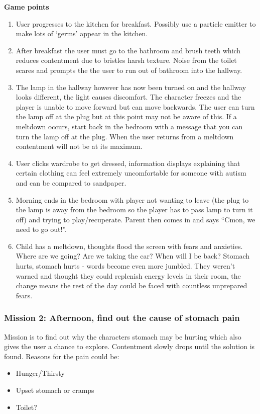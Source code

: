 \documentclass[11pt]{report}
\begin{document}
\textbf{Game points}
\begin{enumerate}
\item User progresses to the kitchen for breakfast. Possibly use a particle emitter to make lots of ‘germs’ appear in the kitchen.
\item After breakfast the user must go to the bathroom and brush teeth which reduces contentment due to bristles harsh texture. Noise from the toilet scares and prompts the the user to run out of bathroom into the hallway.
\item The lamp in the hallway however has now been turned on and the hallway looks different, the light causes discomfort. The character freezes and the player is unable to move forward but can move backwards. The user can turn the lamp off at the plug but at this point may not be aware of this. If a meltdown occurs, start back in the bedroom with a message that you can turn the lamp off at the plug. When the user returns from a meltdown contentment will not be at its maximum.
\item User clicks wardrobe to get dressed, information displays explaining that certain clothing can feel extremely uncomfortable for someone with autism and can be compared to sandpaper.
\item Morning ends in the bedroom with player not wanting to leave (the plug to the lamp is away from the bedroom so the player has to pass lamp to turn it off) and trying to play/recuperate. Parent then comes in and says “Cmon, we need to go out!”.
\item Child has a meltdown, thoughts flood the screen with fears and anxieties. Where are we going? Are we taking the car? When will I be back? Stomach hurts, stomach hurts - words become even more jumbled. They weren't warned and thought they could replenish energy levels in their room, the change means the rest of the day could be faced with countless unprepared fears.
\end{enumerate}

\subsubsection*{Mission 2: Afternoon, find out the cause of stomach pain}
Mission is to find out why the characters stomach may be hurting which also gives the user a chance to explore. Contentment slowly drops until the solution is found. Reasons for the pain could be:

\begin{itemize}
\item Hunger/Thirsty
\item Upset stomach or cramps
\item Toilet?
\end{itemize}
\end{document}
